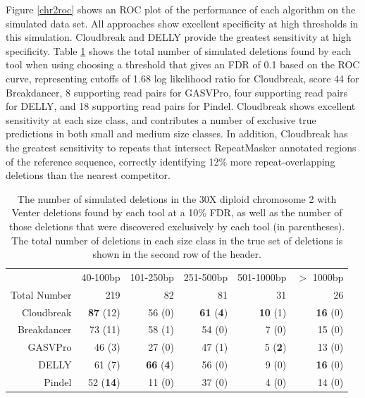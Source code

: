 \documentclass[11pt]{article}
\begin{document}
Figure \ref{chr2roc} shows an ROC plot of the performance of each algorithm on the simulated data set. All approaches show excellent specificity at high thresholds in this simulation. Cloudbreak and DELLY provide the greatest sensitivity at high specificity. Table \ref{chr2preds} shows the total number of simulated deletions found by each tool when using choosing a threshold that gives an FDR of 0.1 based on the ROC curve, representing cutoffs of 1.68 log likelihood ratio for Cloudbreak, score 44 for Breakdancer, 8 supporting read pairs for GASVPro, four supporting read pairs for DELLY, and 18 supporting read pairs for Pindel. Cloudbreak shows excellent sensitivity at each size class, and contributes a number of exclusive true predictions in both small and medium size classes. In addition, Cloudbreak has the greatest sensitivity to repeats that intersect RepeatMasker annotated regions of the reference sequence, correctly identifying 12\% more repeat-overlapping deletions than the nearest competitor.

\begin{table}[b]
\begin{center}
\begin{tabular}{rrrrrr}
  \hline
 & 40-100bp  & 101-250bp  & 251-500bp & 501-1000bp & $>$ 1000bp \\ 
 Total Number & 219 & 82 & 81 & 31 & 26 \\ 
  \hline
Cloudbreak &  \textbf{87} (12) &  56 (0) &  \textbf{61} (\textbf{4}) &  \textbf{10} (1) &  \textbf{16} (0) \\ 
  Breakdancer &  73 (11) &  58 (1) &  54 (0) &  7 (0) &  15 (0) \\ 
  GASVPro &  46 (3) &  27 (0) &  47 (1) &  5 (\textbf{2}) &  13 (0) \\ 
  DELLY &  61 (7) &  \textbf{66} (\textbf{4}) &  56 (0) &  9 (0) &  \textbf{16} (0) \\ 
  Pindel &  52 (\textbf{14}) &  11 (0) &  37 (0) &   4 (0) &  14 (0) \\ 
   \hline
\end{tabular}
\end{center}
\caption{The number of simulated deletions in the 30X diploid chromosome 2 with Venter deletions found by each tool at a 10\% FDR, as well as the number of those deletions that were discovered exclusively by each tool (in parentheses). The total number of deletions in each size class in the true set of deletions is shown in the second row of the header.}
\label{chr2preds}
\end{table}
\end{document}
